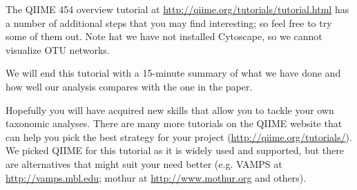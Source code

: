 The QIIME 454 overview tutorial at \url{http://qiime.org/tutorials/tutorial.html} has a number of additional steps that you may find interesting; so feel free to try some of them out. Note hat we have not installed Cytoscape, so we cannot visualize OTU networks.

We will end this tutorial with a 15-minute summary of what we have done and how well our analysis compares with the one in the paper.

Hopefully you will have acquired new skills that allow you to tackle your own taxonomic analyses. There are many more tutorials on the QIIME website that can help you pick the best strategy for your project (\url{http://qiime.org/tutorials/}). We picked QIIME for this tutorial as it is widely used and supported, but there are alternatives that might suit your need better (e.g. VAMPS at \url{http://vamps.mbl.edu}; mothur at \url{http://www.mothur.org} and others).

